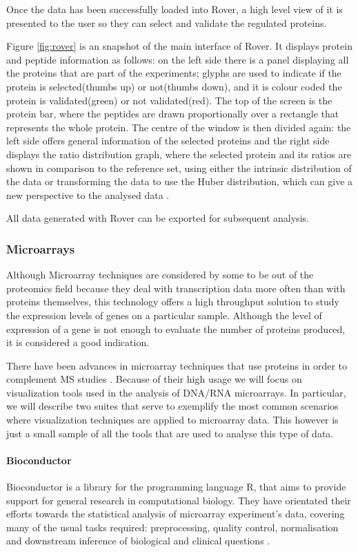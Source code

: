 Once the data has been successfully loaded into Rover, a high level view of it is presented to the user so they can select and validate the regulated proteins. 

Figure \ref{fig:rover} is an snapshot of the main interface of Rover. It displays protein and peptide information as follows: on the left side there is a panel displaying all the proteins that are part of the experiments; glyphs are used to indicate if the protein is selected(thumbs up) or not(thumbs down), and it is colour coded the protein is validated(green) or not validated(red). The top of the screen is the protein bar, where the peptides are drawn proportionally over a rectangle that represents the whole protein. The centre of the window is then divided again: the left side offers general information of the selected proteins and the right side displays the ratio distribution graph, where the selected protein and its ratios are shown in comparison to the reference set, using either the intrinsic distribution of the data or transforming the data to use the Huber distribution, which can give a new perspective to the analysed data \cite{COL2010}.

All data generated with Rover can be exported for subsequent analysis.

\subsubsection{Microarrays}
Although Microarray techniques are considered by some to be out of the proteomics field because they deal with transcription data more often than with proteins themselves, this technology offers a high throughput solution to study the expression levels of genes on a particular sample. Although the level of expression of a gene is not enough to evaluate the number of proteins produced, it is considered a good indication.

There have been advances in microarray techniques that use proteins in order to complement MS studies \cite{PRA2014}. Because of their high usage we will focus on visualization tools used in the analysis of DNA/RNA microarrays. In particular, we will describe two suites that serve to exemplify the most common scenarios where visualization techniques are applied to microarray data. This however is just a small sample of all the tools that are used to analyse this type of data.

\paragraph{Bioconductor}
Bioconductor is a library for the programming language R, that aims to provide support for general research in computational biology. They have orientated their efforts towards the statistical analysis of microarray experiment's data, covering many of the usual tasks required: preprocessing, quality control, normalisation and downstream inference of biological and clinical questions \cite{GEN2004}.

